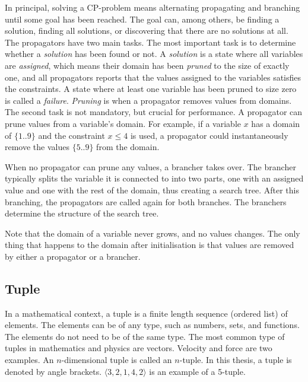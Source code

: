 \documentclass[a4paper,11pt]{article}
\begin{document}
In principal, solving a CP-problem means alternating propagating and branching until some goal has been reached. The goal can, among others, be finding a solution, finding all solutions, or discovering that there are no solutions at all. The propagators have two main tasks. The most important task is to determine whether a \textit{solution} has been found or not. A \textit{solution} is a state where all variables are \textit{assigned}, which means their domain has been \textit{pruned} to the size of exactly one, and all propagators reports that the values assigned to the variables satisfies the constraints. A state where at least one variable has been pruned to size zero is called a \textit{failure}. \textit{Pruning} is when a propagator removes values from domains. The second task is not mandatory, but crucial for performance. A propagator can prune values from a variable's domain. For example, if a variable $x$ has a domain of $\{1..9\}$ and the constraint $x\le 4$ is used, a propagator could instantaneously remove the values $\{5..9\}$ from the domain.

When no propagator can prune any values, a brancher takes over. The brancher typically splits the variable it is connected to into two parts, one with an assigned value and one with the rest of the domain, thus creating a search tree. After this branching, the propagators are called again for both branches. The branchers determine the structure of the search tree.

Note that the domain of a variable never grows, and no values changes. The only thing that happens to the domain after initialisation is that values are removed by either a propagator or a brancher.

\subsection{Tuple}
In a mathematical context, a tuple is a finite length sequence (ordered list) of elements. The elements can be of any type, such as numbers, sets, and functions. The elements do not need to be of the same type. The most common type of tuples in mathematics and physics are vectors. Velocity and force are two examples. An $n$-dimensional tuple is called an $n$-tuple. In this thesis, a tuple is denoted by angle brackets. $\langle 3, 2, 1, 4, 2 \rangle$ is an example of a 5-tuple.
\end{document}

